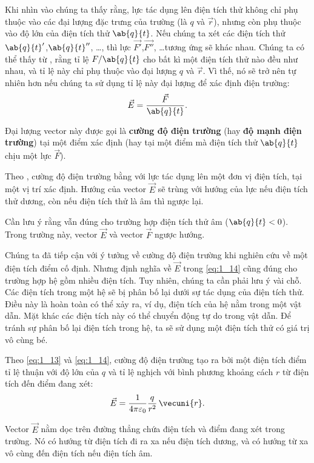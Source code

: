 Khi nhìn vào  chúng ta thấy rằng, lực tác dụng lên điện tích thử không chỉ phụ thuộc vào các đại lượng đặc trưng của trường (là $q$ và $\vec{r}$), nhưng còn phụ thuộc vào độ lớn của điện tích thử $\ab{q}{t}$. Nếu chúng ta xét các điện tích thử $\ab{q}{t}'$,$\ab{q}{t}''$, \ldots, thì lực $\vec{F'}$,$\vec{F''}$, \ldots tương ứng sẽ khác nhau.
Chúng ta có thể thấy từ , rằng tỉ lệ $F/\ab{q}{t}$ cho bất kì một điện tích thử nào đều như nhau, và tỉ lệ này chỉ phụ thuộc vào đại lượng  $q$ và $\vec{r}$. Vì thế, nó sẽ trở nên tự nhiên hơn nếu chúng ta sử dụng tỉ lệ này đại lượng để xác định điện trường:
\begin{equation}\label{eq:1_14}
	\vec{E} = \frac{\vec{F}}{\ab{q}{t}}.
\end{equation}

\noindent
Đại lượng vector này được gọi là \textbf{cường độ điện trường} (hay \textbf{độ mạnh điện trường}) tại một điểm xác định (hay tại một điểm mà điện tích thử $\ab{q}{t}$ chịu một lực $\vec{F}$).

Theo , cường độ điện trường bằng với lực tác dụng lên một đơn vị điện tích, tại một vị trí xác định. Hướng của vector $\vec{E}$ sẽ trùng với hướng của lực nếu điện tích thử dương, còn nếu điện tích thử là âm thì ngược lại.

Cần lưu ý rằng  vẫn đúng cho trường hợp điện tích thử âm ($\ab{q}{t}<0$). Trong trường này, vector $\vec{E}$ và vector $\vec{F}$ ngược hướng.

Chúng ta đã tiếp cận với ý tưởng về cường độ điện trường khi nghiên cứu về một điện tích điểm cố định. Nhưng định nghĩa về $\vec{E}$ trong \eqref{eq:1_14} cũng đúng cho trường hợp hệ gồm nhiều điện tích. Tuy nhiên, chúng ta cần phải lưu ý vài chỗ. Các điện tích trong một hệ sẽ bị phân bố lại dưới sự tác dụng của điện tích thử. Điều này là hoàn toàn có thể xảy ra, ví dụ, điện tích của hệ nằm trong một vật dẫn. Mặt khác các điện tích này có thể chuyển động tự do trong vật dẫn. Để tránh sự phân bố lại điện tích trong hệ, ta sẽ sử dụng một điện tích thử có giá trị vô cùng bé.

Theo \eqref{eq:1_13} và \eqref{eq:1_14}, cường độ điện trường tạo ra bởi một điện tích điểm tỉ lệ thuận với độ lớn của $q$ và tỉ lệ nghịch với bình phương khoảng cách $r$ từ điện tích đến điểm đang xét:
\begin{equation}\label{eq:1_15}
	\vec{E} = \frac{1}{4\pi\varepsilon_0} \frac{q}{r^2}\, \vecuni{r}.
\end{equation}

\noindent
Vector $\vec{E}$ nằm dọc trên đường thẳng chứa điện tích và điểm đang xét trong trường. Nó có hướng từ điện tích đi ra xa nếu điện tích dương, và có hướng từ xa vô cùng đến điện tích nếu điện tích âm.

